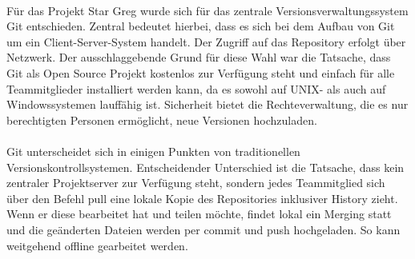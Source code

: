 \\
Für das Projekt Star Greg wurde sich für das zentrale Versionsverwaltungssystem Git entschieden. Zentral bedeutet hierbei, dass es sich bei dem Aufbau von Git um ein Client-Server-System handelt. Der Zugriff auf das Repository erfolgt über Netzwerk. Der ausschlaggebende Grund für diese Wahl war die Tatsache, dass Git als Open Source Projekt kostenlos zur Verfügung steht und einfach für alle Teammitglieder installiert werden kann, da es sowohl auf UNIX- als auch auf Windowssystemen lauffähig ist. Sicherheit bietet die Rechteverwaltung, die es nur berechtigten Personen ermöglicht, neue Versionen hochzuladen. 
\\
\\
Git unterscheidet sich in einigen Punkten von traditionellen Versionskontrollsystemen. Entscheidender Unterschied ist die Tatsache, dass kein zentraler Projektserver zur Verfügung steht, sondern jedes Teammitglied sich über den Befehl pull eine lokale Kopie des Repositories inklusiver History zieht. Wenn er diese bearbeitet hat und teilen möchte, findet lokal ein Merging  statt und die geänderten Dateien werden per commit und push hochgeladen. So kann weitgehend offline gearbeitet werden. 
\


\autorende{}